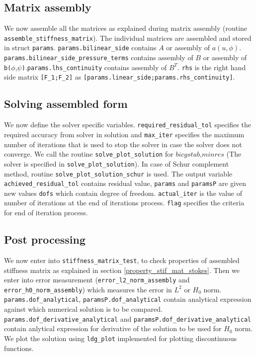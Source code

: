 \documentclass[a4paper,twoside,openright]{book}
\begin{document}
\subsection{Matrix assembly}

We now assemble all the matrices as explained during matrix assembly (routine \verb|assemble_stiffness_matrix|). The individual matrices are assembled and stored in struct \verb|params|. \verb|params.bilinear_side| contains $A$ or assembly of $a(u,\phi)$. \verb|params.bilinear_side_pressure_terms| contains assembly of $B$ or assembly of \verb|b(|$\phi$,$\psi$\verb|)|.\verb|params.lhs_continuity| contains assembly of $B^T$. \verb|rhs| is the right hand side matrix \verb|[F_1;F_2]| as \verb|[params.linear_side;params.rhs_continuity]|. \\

\subsection{Solving assembled form}

We now define the solver specific variables. \verb|required_residual_tol| specifies the required accuracy from solver in solution and \verb|max_iter| specifies the maximum number of iterations that is used to stop the solver in case the solver does not converge. We call the routine \verb|solve_plot_solution| for $bicgstab$,$minres$ (The solver is specified in \verb|solve_plot_solution|). In case of Schur complement method, routine \verb|solve_plot_solution_schur| is used. The output variable \verb|achieved_residual_tol| contains residual value, \verb|params| and \verb|paramsP| are given new values \verb|dofs| which contain degree of freedom. \verb|actual_iter| is the value of number of iterations at the end of iterations process. \verb|flag| specifies the criteria for end of iteration process.\\

\subsection{Post processing}

We now enter into \verb|stiffness_matrix_test|, to check properties of assembled stiffness matrix as explained in section \ref{property_stif_mat_stokes}. Then we enter into error measurement (\verb|error_l2_norm_assembly| and \verb|error_h0_norm_assembly|) which measures the error in $L^2$ or $H_0$ norm. \verb|params.dof_analytical|, \verb|paramsP.dof_analytical| contain analytical expression against which numerical solution is to be compared. \verb|params.dof_derivative_analytical| and \verb|paramsP.dof_derivative_analytical| contain anlytical expression for derivative of the solution to be used for $H_0$ norm. We plot the solution using  \verb|ldg_plot| implemented for plotting discontinuous functions. \\
\end{document}
